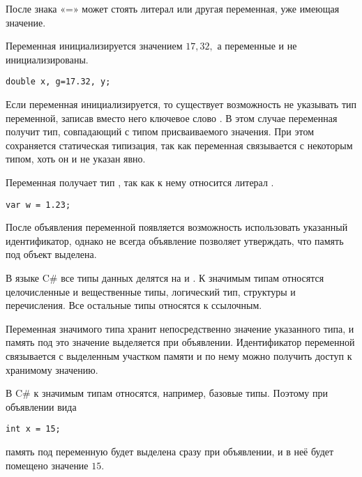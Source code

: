После знака «=» может стоять литерал или другая переменная, уже имеющая
значение.

\begin{example}
  Переменная  инициализируется значением $17{,}32,$ а
  переменные  и  не инициализированы.

\begin{lstlisting}
double x, g=17.32, y;
\end{lstlisting}
\end{example}

Если переменная инициализируется, то существует возможность не
указывать тип переменной, записав вместо него ключевое слово
. В этом случае переменная получит тип, совпадающий с
типом присваиваемого значения. При этом сохраняется статическая
типизация, так как переменная связывается с некоторым типом, хоть он и
не указан явно.

\begin{example}
  Переменная  получает тип , так как к нему
  относится литерал .
  
\begin{lstlisting}
var w = 1.23;
\end{lstlisting}
\end{example}

После объявления переменной появляется возможность использовать
указанный идентификатор, однако не всегда объявление позволяет
утверждать, что память под объект выделена.


В языке C\# все типы данных делятся на  и .
К значимым типам относятся целочисленные и вещественные типы,
логический тип, структуры и перечисления. Все остальные типы относятся
к ссылочным.

Переменная значимого типа хранит непосредственно значение указанного
типа, и память под это значение выделяется при
объявлении. Идентификатор переменной связывается с выделенным участком
памяти и по нему можно получить доступ к хранимому значению.

В C\# к значимым типам относятся, например, базовые типы. Поэтому при
объявлении вида
\begin{lstlisting}
int x = 15;
\end{lstlisting}
память под переменную  будет выделена сразу при объявлении, и в
неё будет помещено значение $15.$

